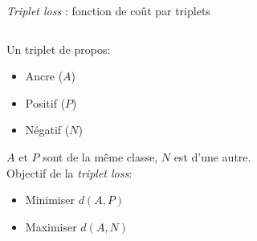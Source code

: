 \documentclass[11pt,aspectratio=169]{beamer}
\begin{document}
\begin{frame}{\textsl{Triplet loss} : fonction de coût par triplets}

\begin{columns}
    \begin{column}{0.3\linewidth}
        Un triplet de propos:
            \begin{itemize}
                \item Ancre ($A$)
                \item Positif ($P$)
                \item Négatif ($N$)
            \end{itemize}
        \vspace{0.5cm}

        $A$ et $P$ sont de la même classe, $N$ est d'une autre.\\

        \vspace{0.5cm}
        Objectif de la \textsl{triplet loss}: 
        \begin{itemize}
        \item Minimiser $d(A,P)$ 
        \item Maximiser $d(A,N)$
        \end{itemize}
    \end{column}
    \begin{column}{0.65\linewidth}
\end{column}
\end{columns}
\end{frame}
\end{document}
